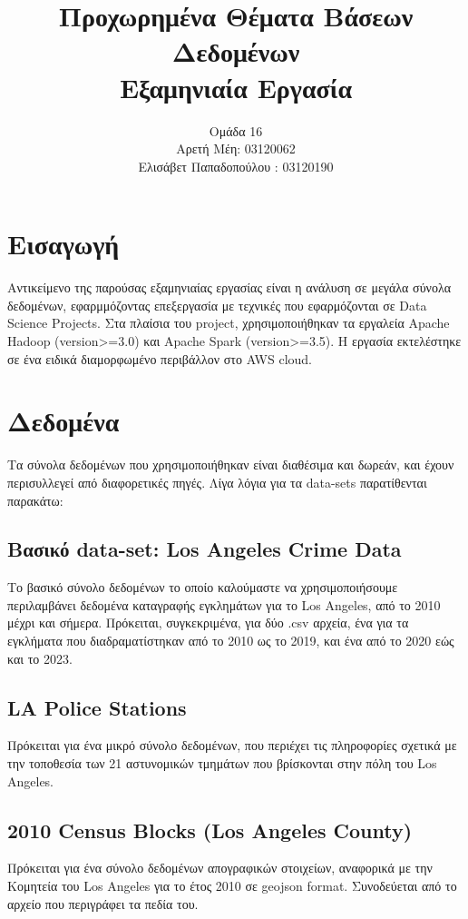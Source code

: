 \documentclass{article}
\begin{document}
\title{Προχωρημένα Θέματα Βάσεων Δεδομένων \\ Εξαμηνιαία Εργασία}
\date{}
\author{ 
\large Ομάδα 16 \\
Αρετή Μέη: 03120062 \\ 
Ελισάβετ Παπαδοπούλου : 03120190
}
\maketitle 
\pagebreak


\section{ Εισαγωγή }
Αντικείμενο της παρούσας εξαμηνιαίας εργασίας είναι η ανάλυση σε μεγάλα σύνολα δεδομένων, εφαρμμόζοντας επεξεργασία με τεχνικές που εφαρμόζονται σε Data Science Projects. Στα πλαίσια του project, χρησιμοποιήθηκαν τα εργαλεία Apache Hadoop (version>=3.0) και Apache Spark (version>=3.5). Η εργασία εκτελέστηκε σε ένα ειδικά διαμορφωμένο περιβάλλον στο AWS cloud. 

\section{ Δεδομένα }
Τα σύνολα δεδομένων που χρησιμοποιήθηκαν είναι διαθέσιμα και δωρεάν, και έχουν περισυλλεγεί από διαφορετικές πηγές. Λίγα λόγια για τα data-sets παρατίθενται παρακάτω: 

\subsection{ Βασικό data-set: Los Angeles Crime Data }
Το βασικό σύνολο δεδομένων το οποίο καλούμαστε να χρησιμοποιήσουμε περιλαμβάνει δεδομένα καταγραφής εγκλημάτων για το Los Angeles, από το 2010 μέχρι και σήμερα. Πρόκειται, συγκεκριμένα, για δύο .csv αρχεία, ένα για τα εγκλήματα που διαδραματίστηκαν από το 2010 ως το 2019, και ένα από το 2020 εώς και το 2023. 

\subsection{ LA Police Stations } 
Πρόκειται για ένα μικρό σύνολο δεδομένων, που περιέχει τις πληροφορίες σχετικά με την τοποθεσία των 21 αστυνομικών τμημάτων που βρίσκονται στην πόλη του Los Angeles. 

\subsection{ 2010 Census Blocks (Los Angeles County)}
Πρόκειται για ένα σύνολο δεδομένων απογραφικών στοιχείων, αναφορικά με την Κομητεία του Los Angeles για το έτος 2010 σε geojson format. Συνοδεύεται από το αρχείο που περιγράφει τα πεδία του.
\end{document}
